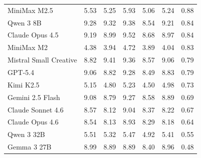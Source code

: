 \begin{longtable}{lrrrrrr}
MiniMax M2.5 & 5.53 & 5.25 & 5.93 & 5.06 & 5.24 & 0.88 \\
Qwen 3 8B & 9.28 & 9.32 & 9.38 & 8.54 & 9.21 & 0.84 \\
Claude Opus 4.5 & 9.19 & 8.99 & 9.52 & 8.68 & 8.97 & 0.84 \\
MiniMax M2 & 4.38 & 3.94 & 4.72 & 3.89 & 4.04 & 0.83 \\
Mistral Small Creative & 8.82 & 9.41 & 9.36 & 8.57 & 9.06 & 0.79 \\
GPT-5.4 & 9.06 & 8.82 & 9.28 & 8.49 & 8.83 & 0.79 \\
Kimi K2.5 & 5.15 & 4.80 & 5.23 & 4.50 & 4.98 & 0.73 \\
Gemini 2.5 Flash & 9.08 & 8.79 & 9.27 & 8.58 & 8.89 & 0.69 \\
Claude Sonnet 4.6 & 8.57 & 8.12 & 9.04 & 8.37 & 8.22 & 0.67 \\
Claude Opus 4.6 & 8.54 & 8.13 & 8.93 & 8.29 & 8.18 & 0.64 \\
Qwen 3 32B & 5.51 & 5.32 & 5.47 & 4.92 & 5.41 & 0.55 \\
Gemma 3 27B & 8.99 & 8.89 & 8.89 & 8.40 & 8.96 & 0.48 \\
\end{longtable}